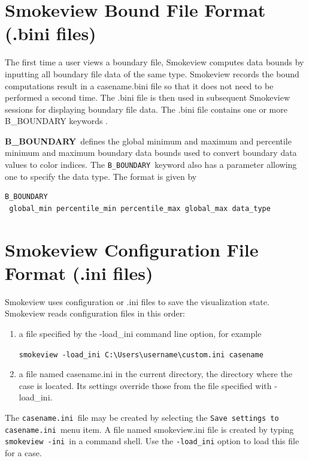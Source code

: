 \documentclass[11pt,twoside]{book}
\begin{document}
\section{Smokeview Bound File Format (.bini files)}
The first time a user views a boundary file, Smokeview computes data bounds by inputting
all boundary file data of the same type.
Smokeview records the bound computations result in a casename.bini file
so that it does not need to be performed a second time.  The .bini file is
then used in subsequent Smokeview sessions for displaying boundary file data.
The .bini file contains one or more B\_BOUNDARY keywords .

{\bf B\_BOUNDARY}\ defines the global minimum and maximum and percentile minimum and
maximum boundary
data bounds used to convert boundary data values to color indices.
The {\tt B\_BOUNDARY}\ keyword also has a parameter allowing
one to specify the data type.  The format is given by
\begin{lstlisting}
B_BOUNDARY
 global_min percentile_min percentile_max global_max data_type
\end{lstlisting}

\section{Smokeview Configuration File Format (.ini files)}
\label{sectionconfig}
\label{appendixini}

Smokeview uses configuration or .ini files to save the visualization state.
Smokeview reads configuration files in this order:
\begin{enumerate}
\item a file specified by the -load\_ini command line option, for example

{\tt smokeview -load\_ini C:\textbackslash Users\textbackslash username\textbackslash custom.ini casename}

\item a file named casename.ini in the current directory, the directory where the case is located. Its settings override those from the file specified with -load\_ini.
\end{enumerate}

The {\tt casename.ini}\ file may be created by selecting the {\tt Save settings to casename.ini}\ menu item.
A file named smokeview.ini file is created by typing {\tt smokeview -ini}\ in a command shell.
Use the {\tt -load\_ini} option to load this file for a case.
\end{document}
